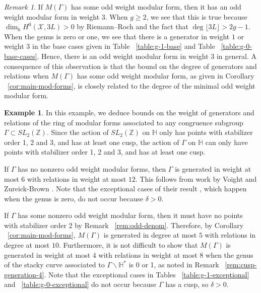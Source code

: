 \documentclass{amsart}
\theoremstyle{plain}
\theoremstyle{definition}
\newtheorem{example}[thm]{Example}
\theoremstyle{remark}
\newtheorem{rem}[thm]{Remark}
\numberwithin{equation}{section}
\newcommand\BH{{\mathbb H}}
\newcommand\BZ{{\mathbb Z}}
\newcommand\Bk{{\Bbbk}}
\newcommand\sx{\mathscr X}
\newcommand{\halfcan}{L}
\begin{document}
\begin{rem}
\label{rem:gen-at-most-three}
If $M(\Gamma)$ has some odd weight modular form, then it has an odd weight modular form in weight $3$. When $g \geq 2$, we see that this is true because $\dim_\Bk H^0(\sx, 3\halfcan) > 0$ by Riemann--Roch and the fact that $\deg \lfloor 3\halfcan \rfloor > 2g - 1$. When the genus is zero or one, we see that there is a generator in weight $1$ or weight $3$ in the base cases given in Table ~\ref{table:g-1-base} and Table ~\ref{table:g-0-base-cases}. Hence, there is an odd weight modular form in weight $3$ in general. A consequence of this observation is that the bound on the degree of generators and relations when $M(\Gamma)$ has some odd weight modular form, as given in Corollary ~\ref{cor:main-mod-forms}, is closely related to the degree of the minimal odd weight modular form.
\end{rem}

\begin{example}
\label{eg:congruence-bounds}
In this example, we deduce bounds on the weight of generators and relations of the ring of modular forms associated to any congruence subgroup $\Gamma \subset SL_2(\BZ)$. Since
the action  of $SL_2(\BZ)$ on $\BH$ only has points with stabilizer
order 1, 2 and 3, and has at least one cusp, the
action of $\Gamma$ on $\BH$ can only have points with stabilizer order 1, 2 and 3, and has at least one cusp.

If $\Gamma$ has no nonzero odd weight modular forms, then $\Gamma$ is generated in weight at most $6$ with relations in weight at most $12$. This follows from work by Voight and Zureick-Brown \cite[Theorem 1.4 and Theorem 9.3.1]{vzb:stacky}. Note that the exceptional cases of their result \cite[Theorem 9.3.1]{vzb:stacky}, which happen when the genus is zero, do not occur because $\delta > 0$.

If $\Gamma$ has some nonzero odd weight modular form, then it must 
have no points with stabilizer order 2 by Remark ~\ref{rem:odd-denom}. 
Therefore, by Corollary ~\ref{cor:main-mod-forms}, $M(\Gamma)$ is 
generated in degree at most $5$ with relations in degree at most $10$. Furthermore, it is not difficult to show that $M(\Gamma)$ is generated in weight at most 4 with relations in weight at most 8 when the genus of the stacky curve associated to $\Gamma \backslash \BH^*$ is 0 or 1, as noted in Remark ~\ref{rem:cusp-generation-4}. Note that the exceptional cases in Tables ~\ref{table:g-1-exceptional} and ~\ref{table:g-0-exceptional} do not occur because $\Gamma$ has a cusp, so $\delta > 0$.
\end{example}
\end{document}
